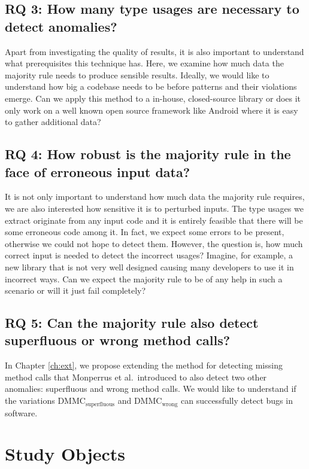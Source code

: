 \subsection{RQ 3: How many type usages are necessary to detect anomalies?}

Apart from investigating the quality of results, it is also important to understand what prerequisites this technique has.
Here, we examine how much data the majority rule needs to produce sensible results.
Ideally, we would like to understand how big a codebase needs to be before patterns and their violations emerge.
Can we apply this method to a in-house, closed-source library or does it only work on a well known open source framework like Android where it is easy to gather additional data?

\subsection{RQ 4: How robust is the majority rule in the face of erroneous input data?}

It is not only important to understand how much data the majority rule requires, we are also interested how sensitive it is to perturbed inputs.
The type usages we extract originate from any input code and it is entirely feasible that there will be some erroneous code among it.
In fact, we expect some errors to be present, otherwise we could not hope to detect them.
However, the question is, how much correct input is needed to detect the incorrect usages?
Imagine, for example, a new library that is not very well designed causing many developers to use it in incorrect ways.
Can we expect the majority rule to be of any help in such a scenario or will it just fail completely?

\subsection{RQ 5: Can the majority rule also detect superfluous or wrong method calls?}

In Chapter \ref{ch:ext}, we propose extending the method for detecting missing method calls that Monperrus et al.\ introduced to also detect two other anomalies: superfluous and wrong method calls.
We would like to understand if the variations $\text{DMMC}_\text{superfluous}$ and $\text{DMMC}_\text{wrong}$ can successfully detect bugs in software.

\section{Study Objects} 

